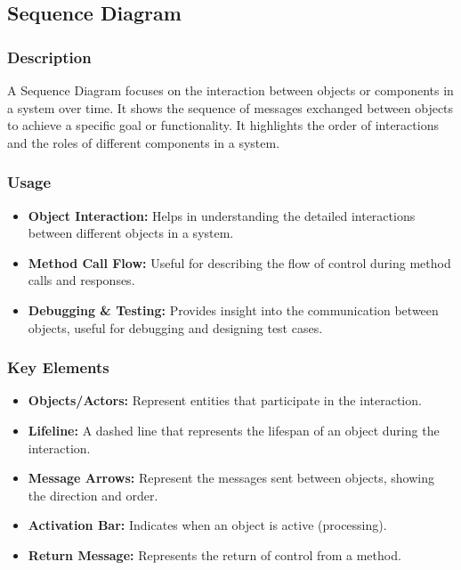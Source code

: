 \subsection{Sequence Diagram}
\subsubsection{Description}
A Sequence Diagram focuses on the interaction between objects or components in a system over time. It shows the sequence of messages exchanged between objects to achieve a specific goal or functionality. It highlights the order of interactions and the roles of different components in a system.

\subsubsection{Usage}
\begin{itemize}
    \item \textbf{Object Interaction:} Helps in understanding the detailed interactions between different objects in a system.
    \item \textbf{Method Call Flow:} Useful for describing the flow of control during method calls and responses.
    \item \textbf{Debugging \& Testing:} Provides insight into the communication between objects, useful for debugging and designing test cases.
\end{itemize}

\subsubsection{Key Elements}
\begin{itemize}
    \item \textbf{Objects/Actors:} Represent entities that participate in the interaction.
    \item \textbf{Lifeline:} A dashed line that represents the lifespan of an object during the interaction.
    \item \textbf{Message Arrows:} Represent the messages sent between objects, showing the direction and order.
    \item \textbf{Activation Bar:} Indicates when an object is active (processing).
    \item \textbf{Return Message:} Represents the return of control from a method.
\end{itemize}

